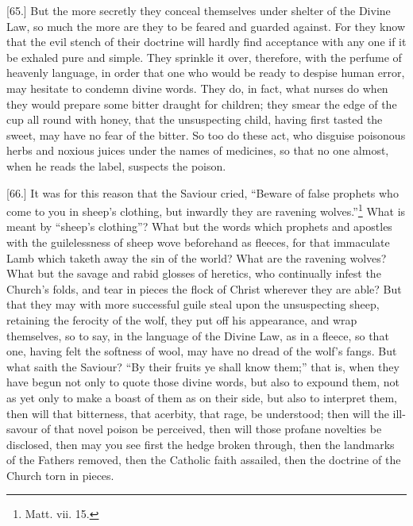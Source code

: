 [65.] But the more secretly they conceal themselves under shelter of the Divine Law, so much the more are they to be feared and guarded against. For they know that the evil stench of their doctrine will hardly find acceptance with any one if it be exhaled pure and simple. They sprinkle it over, therefore, with the perfume of heavenly language, in order that one who would be ready to despise human error, may hesitate to condemn divine words. They do, in fact, what nurses do when they would prepare some bitter draught for children; they smear the edge of the cup all round with honey, that the unsuspecting child, having first tasted the sweet, may have no fear of the bitter. So too do these act, who disguise poisonous herbs and noxious juices under the names of medicines, so that no one almost, when he reads the label, suspects the poison.

[66.] It was for this reason that the Saviour cried, “Beware of false prophets who come to you in sheep’s clothing, but inwardly they are ravening wolves.”\footnote{Matt. vii. 15.} What is meant by “sheep’s clothing”? What but the words which prophets and apostles with the guilelessness of sheep wove beforehand as fleeces, for that immaculate Lamb which taketh away the sin of the world? What are the ravening wolves? What but the savage and rabid glosses of heretics, who continually infest the Church’s folds, and tear in pieces the flock of Christ wherever they are able? But that they may with more successful guile steal upon the unsuspecting sheep, retaining the ferocity of the wolf, they put off his appearance, and wrap themselves, so to say, in the language of the Divine Law, as in a fleece, so that one, having felt the softness of wool, may have no dread of the wolf’s fangs. But what saith the Saviour? “By their fruits ye shall know them;” that is, when they have begun not only to quote those divine words, but also to expound them, not as yet only to make a boast of them as on their side, but also to interpret them, then will that bitterness, that acerbity, that rage, be understood; then will the ill-savour of that novel poison be perceived, then will those profane novelties be disclosed, then may you see first the hedge broken through, then the landmarks of the Fathers removed, then the Catholic faith assailed, then the doctrine of the Church torn in pieces.


